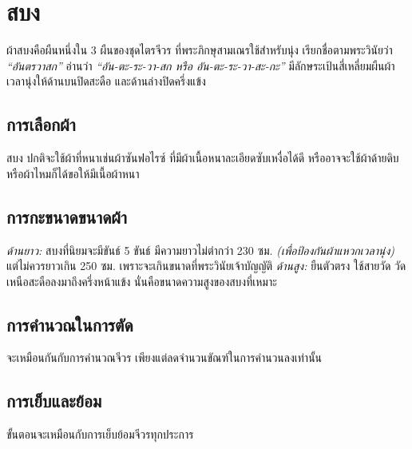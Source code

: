 \chapter{สบง}

ผ้าสบงคือผืนหนึ่งใน 3 ผืนของชุดไตรจีวร ที่พระภิกษุสามเณรใช้สำหรับนุ่ง
เรียกชื่อตามพระวินัยว่า \emph{``อันตรวาสก''} อ่านว่า
\emph{``อัน-ตะ-ระ-วา-สก หรือ อัน-ตะ-ระ-วา-สะ-กะ''}
มีลักษระเป้นสี่เหลี่ยมผืนผ้า เวลานุ่งให้ด้านบนปิดสะดือ
และด้านล่างปิดครึ่งแข้ง

\section{การเลือกผ้า}

สบง ปกติจะใช้ผ้าที่หนาเช่นผ้าซันฟอไรซ์
ที่มีผ้าเนื้อหนาละเอียดซับเหงื่อได้ดี
หรืออาจจะใช้ผ้าด้ายดิบหรือผ้าไหมก็ได้ขอให้มีเนื้อผ้าหนา

\section{การกะขนาดขนาดผ้า}

\emph{ด้านยาว:} สบงที่นิยมจะมีขันธ์ 5 ขันธ์ มีความยาวไม่ตำกว่า 230 ซม.
\emph{(เพื่อป้องกันผ้าแหวกเวลานุ่ง)} แต่ไม่ควรยาวเกิน 250 ซม.
เพราะจะเกินขนาดที่พระวินัยเจ้าบัญญัติ \emph{ด้านสูง:} ยืนตัวตรง
ใช้สายวัด วัดเหนือสะดือลงมาถึงครึ่งหน้าแข้ง
นั่นคือขนาดความสูงของสบงที่เหมาะ

\section{การคำนวณในการตัด}

จะเหมือนกันกับการคำนวณจีวร เพียงแต่ลดจำนวนขัณฑ์ในการคำนวนลงเท่านั้น

\section{การเย็บและย้อม}

ขั้นตอนจะเหมือนกับการเย็บย้อมจีวรทุกประการ

